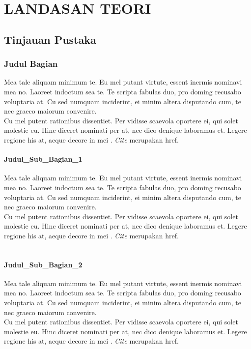 \chapter{LANDASAN TEORI}
\vspace{4.5pt}

\section{Tinjauan Pustaka}

\subsection{Judul Bagian}
Mea tale aliquam minimum te. Eu mel putant virtute, essent inermis nominavi mea no. Laoreet indoctum sea te. Te scripta fabulas duo, pro doming recusabo voluptaria at. Cu sed numquam inciderint, ei minim altera disputando cum, te nec graeco maiorum convenire.\\
Cu mel putent rationibus dissentiet. Per vidisse scaevola oportere ei, qui solet molestie eu. Hinc diceret nominati per at, nec dico denique laboramus et. Legere regione his at, aeque decore in mei \cite{1}. \textit{Cite} merupakan href.\\

\subsubsection{Judul\_Sub\_Bagian\_1}
Mea tale aliquam minimum te. Eu mel putant virtute, essent inermis nominavi mea no. Laoreet indoctum sea te. Te scripta fabulas duo, pro doming recusabo voluptaria at. Cu sed numquam inciderint, ei minim altera disputando cum, te nec graeco maiorum convenire.\\
Cu mel putent rationibus dissentiet. Per vidisse scaevola oportere ei, qui solet molestie eu. Hinc diceret nominati per at, nec dico denique laboramus et. Legere regione his at, aeque decore in mei \cite{sosmed}. \textit{Cite} merupakan href.\\\\

\subsubsection{Judul\_Sub\_Bagian\_2}
Mea tale aliquam minimum te. Eu mel putant virtute, essent inermis nominavi mea no. Laoreet indoctum sea te. Te scripta fabulas duo, pro doming recusabo voluptaria at. Cu sed numquam inciderint, ei minim altera disputando cum, te nec graeco maiorum convenire.\\
Cu mel putent rationibus dissentiet. Per vidisse scaevola oportere ei, qui solet molestie eu. Hinc diceret nominati per at, nec dico denique laboramus et. Legere regione his at, aeque decore in mei \cite{sosmed}. \textit{Cite} merupakan href.\\\\

